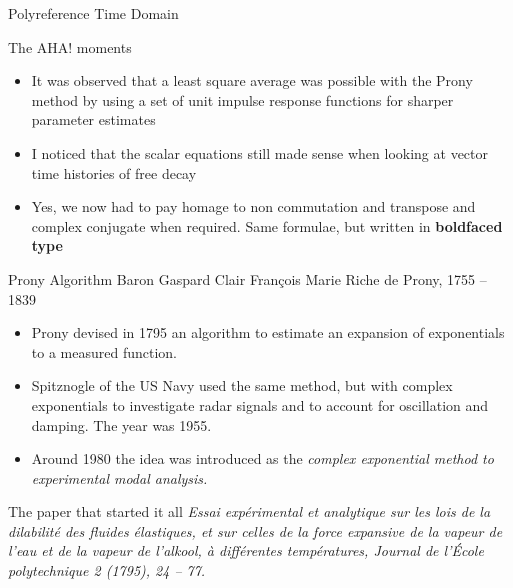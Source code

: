 \documentclass[aspectratio=169,10pt]{beamer} \mode<presentation>
\begin{document}
\begin{frame}{Polyreference Time Domain}
  \begin{block}{The AHA! moments}
    \begin{itemize}[<+->]
    \item It was observed that a least square average was possible with the Prony method by using a set of unit impulse response functions for sharper parameter estimates    
    \item I noticed that the scalar equations still made sense when looking at vector time histories of free decay
    \item Yes, we now had to pay homage to non commutation and transpose and complex conjugate when required. Same formulae, but written in \bf{boldfaced type}
  \end{itemize}
\end{block}

\end{frame}

\begin{frame}[t]{Prony Algorithm}
  Baron Gaspard Clair François Marie Riche de Prony, 1755 -- 1839
  \vspace{8mm}
  \begin{itemize}[<+->]
    \item Prony devised in 1795 an algorithm to estimate an expansion of exponentials to a measured function.
    \item Spitznogle of the US Navy used the same method, but with complex exponentials to investigate radar signals and to account for oscillation and damping. The year was 1955.
    \item Around 1980 the idea was introduced as the \it{complex exponential} method to experimental modal analysis.
  \end{itemize} 
  \vspace{5mm}
  \begin{block}{The paper that started it all}
  \it{Essai expérimental et analytique sur les lois de la dilabilité des
fluides élastiques, et sur celles de la force expansive de la vapeur de l’eau
et de la vapeur de l’alkool, à différentes températures}, Journal de l’École
polytechnique 2 (1795), 24 – 77.
\end{block}
\end{frame}
\end{document}
